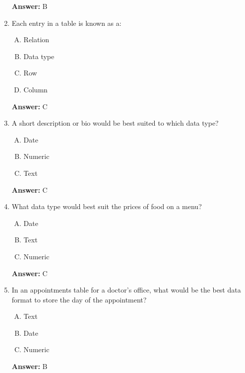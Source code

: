 \documentclass[12pt]{article}
\begin{document}
\begin{enumerate}[1.]
    \bigskip

    \textbf{Answer:} B

    \item

    Each entry in a table is known as a:

    \bigskip

    \begin{enumerate}[A.]
        \item Relation
        \item Data type
        \item Row
        \item Column
    \end{enumerate}

    \bigskip

    \textbf{Answer:} C

    \item

    A short description or bio would be best suited to which data type?

    \bigskip

    \begin{enumerate}[A.]
        \item Date
        \item Numeric
        \item Text
    \end{enumerate}

    \bigskip

    \textbf{Answer:} C

    \item

    What data type would best suit the prices of food on a menu?

    \bigskip

    \begin{enumerate}[A.]
        \item Date
        \item Text
        \item Numeric
    \end{enumerate}

    \bigskip

    \textbf{Answer:} C

    \item

    In an appointments table for a doctor's office, what would be the best data
    format to store the day of the appointment?

    \bigskip

    \begin{enumerate}[A.]
        \item Text
        \item Date
        \item Numeric
    \end{enumerate}

    \bigskip

    \textbf{Answer:} B
\end{enumerate}
\end{document}
